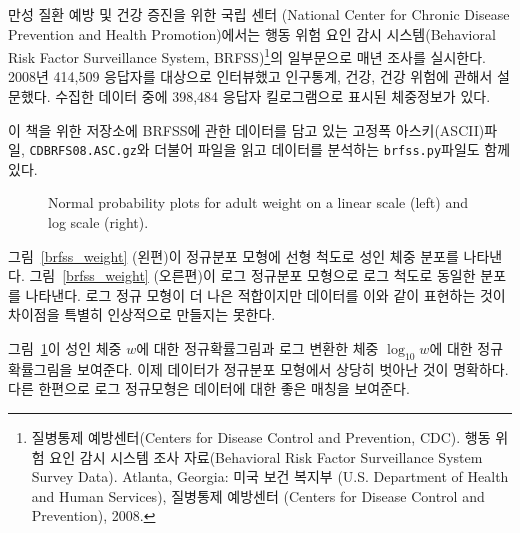 만성 질환 예방 및 건강 증진을 위한 국립 센터 (National Center for Chronic Disease Prevention and Health Promotion)에서는 
행동 위험 요인 감시 시스템(Behavioral Risk Factor Surveillance System, BRFSS)\footnote{질병통제 예방센터(Centers for Disease Control and Prevention, CDC). 행동 위험 요인 감시 시스템 조사 자료(Behavioral Risk Factor Surveillance System Survey Data). Atlanta, Georgia: 미국 보건 복지부 (U.S. Department of Health and Human Services), 질병통제 예방센터 (Centers for Disease Control and Prevention), 2008.}의 일부문으로 매년 조사를 실시한다.
2008년 414,509 응답자를 대상으로 인터뷰했고 인구통계, 건강, 건강 위험에 관해서 설문했다. 수집한 데이터 중에 398,484 응답자 킬로그램으로 표시된 체중정보가 있다.

이 책을 위한 저장소에 BRFSS에 관한 데이터를 담고 있는 고정폭 아스키(ASCII)파일, {\tt CDBRFS08.ASC.gz}와 더불어 파일을 읽고 데이터를 분석하는 {\tt brfss.py}파일도 함께 있다.

\begin{figure}
\caption{Normal probability plots for adult weight on a linear scale
  (left) and log scale (right).}
\label{brfss_weight_normal}
\end{figure}

그림~\ref{brfss_weight} (왼편)이 정규분포 모형에 선형 척도로 성인 체중 분포를 나타낸다.
그림~\ref{brfss_weight} (오른편)이 로그 정규분포 모형으로 로그 척도로 동일한 분포를 나타낸다.
로그 정규 모형이 더 나은 적합이지만 데이터를 이와 같이 표현하는 것이 차이점을 특별히 인상적으로 만들지는 못한다.

그림~\ref{brfss_weight_normal}이 성인 체중 $w$에 대한 정규확률그림과 
로그 변환한 체중 $\log_{10} w$에 대한 정규확률그림을 보여준다.
이제 데이터가 정규분포 모형에서 상당히 벗아난 것이 명확하다.
다른 한편으로 로그 정규모형은 데이터에 대한 좋은 매칭을 보여준다.



